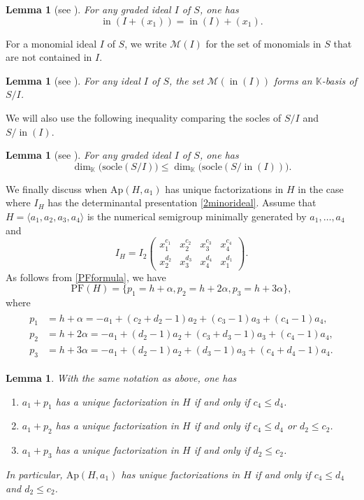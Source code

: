 \documentclass[12pt]{amsart}
\numberwithin{equation}{section}
\newtheorem{lemma}[theorem]{Lemma}
\theoremstyle{definition}
\newcommand{\init}{\ensuremath{\mathop{\mathrm{in}}}}
\newcommand{\PF}{\mathrm{PF}}
\newcommand{\socle}{\mathrm{socle}}
\newcommand{\F}{\mathbb{K}}
\newcommand{\Ap}{\mathrm{Ap}}
\begin{document}
\begin{lemma}[{see \cite[Proposition 15.12]{Ei}}]
\label{lem1}
For any graded ideal $I$ of $S$, one has
\[
\init(I+(x_1))=\init(I)+(x_1).
\]
\end{lemma}

For a monomial ideal $I$ of $S$, we write $\mathcal M(I)$ for the set
of monomials in $S$ that are not contained in $I$.

\begin{lemma}[{see \cite[Proposition 2.2.5]{HH}}]
\label{lem2}
For any ideal $I$ of $S$, the set $\mathcal M(\init(I))$ forms an
$\F$-basis of $S/I$.
\end{lemma}

We will also use the following inequality comparing the socles of
$S/I$ and $S/\init(I)$.

\begin{lemma}[{see \cite[Theorem 3.3.1]{HH}}]
\label{lem3}
For any graded ideal $I$ of $S$, one has
\[
\dim_\F\big(\socle(S/I)\big)
\leq
\dim_\F\big(\socle(S/\init(I))\big).
\]
\end{lemma}

We finally discuss when $\Ap(H,a_1)$ has unique factorizations in $H$
in the case where $I_H$ has the determinantal presentation
\eqref{2minorideal}.
Assume that
$H=\langle a_1,a_2,a_3,a_4\rangle$
is the numerical semigroup minimally generated by $a_1,\dots,a_4$ and
\[
I_H=
I_2
\begin{pmatrix}
x_1^{c_1} & x_2^{c_2} & x_3^{c_3} & x_4^{c_4}\\
x_2^{d_2} & x_3^{d_3} & x_4^{d_4} & x_1^{d_1}
\end{pmatrix}.
\]
As follows from \eqref{PFformula}, we have
\[
\PF(H)=\{p_1=h+\alpha,p_2=h+2\alpha,p_3=h+3\alpha\},
\]
where
\begin{align}
\label{4presentation}
\begin{array}{ll}
p_1
&=h+\alpha
=-a_1+(c_2+d_2-1)a_2+(c_3-1)a_3+(c_4-1)a_4,\\
p_2
&=h+2\alpha
=-a_1+(d_2-1)a_2+(c_3+d_3-1)a_3+(c_4-1)a_4,\\
p_3
&=h+3\alpha
=-a_1+(d_2-1)a_2+(d_3-1)a_3+(c_4+d_4-1)a_4.
\end{array}
\end{align}

\begin{lemma}
\label{uniqueAP}
With the same notation as above, one has
\begin{enumerate}
    \item
    $a_1+p_1$ has a unique factorization in $H$ if and only if
    $c_4\leq d_4$.
    \item
    $a_1+p_2$ has a unique factorization in $H$ if and only if
    $c_4\leq d_4$ or $d_2\leq c_2$.
    \item
    $a_1+p_3$ has a unique factorization in $H$ if and only if
    $d_2\leq c_2$.
\end{enumerate}
In particular, $\Ap(H,a_1)$ has unique factorizations in $H$ if and
only if $c_4\leq d_4$ and $d_2\leq c_2$.
\end{lemma}
\end{document}
